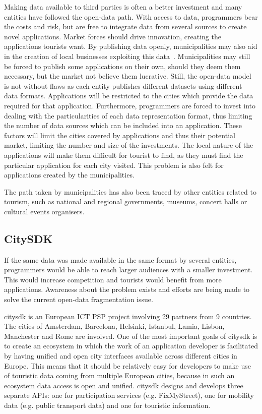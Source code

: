 \documentclass[times]{ettauth}
\begin{document}
Making data available to third parties is often a better investment and many entities have followed the open-data path.
With access to data, programmers bear the costs and risk, but are free to integrate data from several sources to create novel applications.
Market forces should drive innovation, creating the applications tourists want.
By publishing data openly, municipalities may also aid in the creation of local businesses exploiting this data~\cite{6525605}.
Municipalities may still be forced to publish some applications on their own, should they deem them necessary, but the market not believe them lucrative. 
Still, the open-data model is not without flaws as each entity publishes different datasets using different data formats.
Applications will be restricted to the cities which provide the data required for that application.
Furthermore, programmers are forced to invest into dealing with the particularities of each data representation format, thus limiting the number of data sources which can be included into an application.
These factors will limit the cities covered by applications and thus their potential market, limiting the number and size of the investments.
The local nature of the applications will make them difficult for tourist to find, as they must find the particular application for each city visited.
This problem is also felt for applications created by the municipalities.

The path taken by municipalities has also been traced by other entities related to tourism, such as national and regional governments, museums, concert halls or cultural events organisers.

\subsection{CitySDK}
\label{s:citysdk}

If the same data was made available in the same format by several entities, programmers would be able to reach larger audiences with a smaller investment. 
This would increase competition and tourists would benefit from more applications.
Awareness about the problem exists and efforts are being made to solve the current open-data fragmentation issue.

\ac{citysdk} is an European ICT PSP project involving 29 partners from 9 countries.
The cities of Amsterdam, Barcelona, Helsinki, Istanbul, Lamia, Lisbon, Manchester and Rome are involved.
One of the most important goals of \ac{citysdk} is to create an ecosystem in which the work of an application developer is facilitated by having unified and open city interfaces available across different cities in Europe. 
This means that it should be relatively easy for developers to make use of touristic data coming from multiple European cities, because in such an ecosystem data access is open and unified. 
\ac{citysdk} designs and develops three separate APIs: one for participation services (e.g. FixMyStreet), one for mobility data (e.g. public transport data) and one for touristic information. 
 
\end{document}
